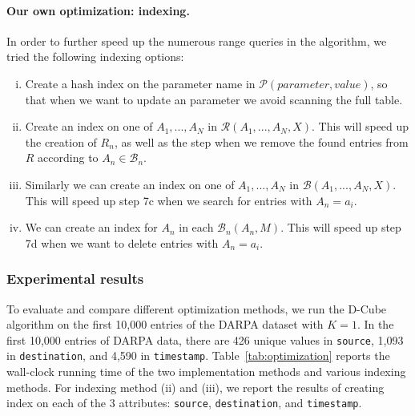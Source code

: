  \paragraph{Our own optimization: indexing.} In order to further speed up the numerous range queries in the algorithm, we tried the following indexing options:
\begin{enumerate}[(i)]

\item Create a hash index on the parameter name in $\mathcal{P}(parameter, value)$, so that when we want to update an parameter we avoid scanning the full table.

\item Create an index on one of $A_1, ..., A_N$ in $\mathcal{R}(A_1, ..., A_N, X)$. This will speed up the creation of $R_n$, as well as the step when we remove the found entries from $R$ according to $A_n \in \mathcal{B}_n$. 

\item Similarly we can create an index on one of $A_1, ..., A_N$ in $\mathcal{B}(A_1, ..., A_N, X)$. This will speed up step 7c when we search for entries with $A_n=a_i$. 

\item We can create an index for $A_n$ in each $\mathcal{B}_n(A_n, M)$. This will speed up step 7d when we want to delete entries with $A_n=a_i$.

\end{enumerate}

 \subsubsection{Experimental results}
To evaluate and compare different optimization methods, we run the D-Cube algorithm on the first 10,000 entries of the DARPA dataset with $K=1$.  In the first 10,000 entries of DARPA data, there are 426 unique values in {\tt source}, 1,093 in {\tt destination}, and 4,590 in {\tt timestamp}.
Table~\ref{tab:optimization} reports the wall-clock running time of the two implementation methods and various indexing methods. For indexing method (ii) and (iii), we report the results of creating index on each of the 3 attributes: {\tt source}, {\tt destination}, and {\tt timestamp}. 

